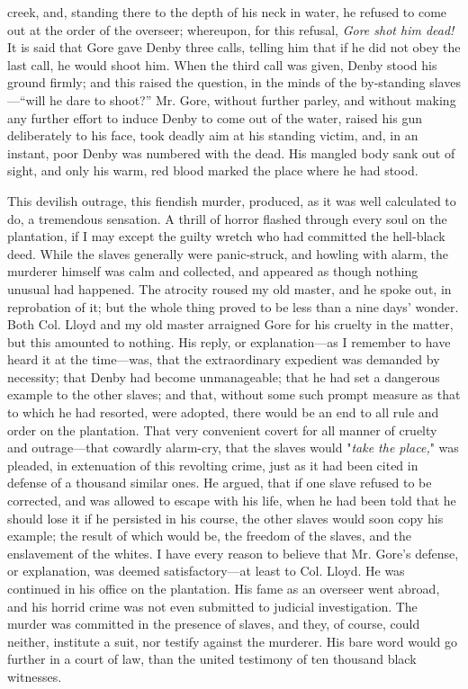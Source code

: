 creek, and, standing there to the depth of his neck in water, he refused
to come out at the order of the overseer; whereupon, for this refusal,
\emph{Gore shot him dead!} It is said that Gore gave Denby three calls,
telling him that if he did not obey the last call, he would shoot him.
When the third call was given, Denby stood his ground firmly; and this
raised the question, in the minds of the by-standing slaves---``will he
dare to shoot?'' Mr. Gore, without further parley, and without making
any further effort to induce Denby to come out of the water, raised his
gun deliberately to his face, took deadly aim at his standing victim,
and, in an instant, poor Denby was numbered with the dead. His mangled
body sank out of {}sight, and only his warm, red blood marked the place
where he had stood.

This devilish outrage, this fiendish murder, produced, as it was well
calculated to do, a tremendous sensation. A thrill of horror flashed
through every soul on the plantation, if I may except the guilty wretch
who had committed the hell-black deed. While the slaves generally were
panic-struck, and howling with alarm, the murderer himself was calm and
collected, and appeared as though nothing unusual had happened. The
atrocity roused my old master, and he spoke out, in reprobation of it;
but the whole thing proved to be less than a nine days' wonder. Both
Col. Lloyd and my old master arraigned Gore for his cruelty in the
matter, but this amounted to nothing. His reply, or explanation---as I
remember to have heard it at the time---was, that the extraordinary
expedient was demanded by necessity; that Denby had become unmanageable;
that he had set a dangerous example to the other slaves; and that,
without some such prompt measure as that to which he had resorted, were
adopted, there would be an end to all rule and order on the plantation.
That very convenient covert for all manner of cruelty and outrage---that
cowardly alarm-cry, that the slaves would "\emph{take the place,}" was
pleaded, in extenuation of this revolting crime, just as it had been
cited in defense of a thousand similar ones. He argued, that if one
slave refused to be corrected, and was allowed to escape with his life,
when he had been told that he should lose it if he persisted in his
course, the other slaves would soon copy his example; the result of
which would be, the {}freedom of the slaves, and the enslavement of the
whites. I have every reason to believe that Mr. Gore's defense, or
explanation, was deemed satisfactory---at least to Col. Lloyd. He was
continued in his office on the plantation. His fame as an overseer went
abroad, and his horrid crime was not even submitted to judicial
investigation. The murder was committed in the presence of slaves, and
they, of course, could neither, institute a suit, nor testify against
the murderer. His bare word would go further in a court of law, than the
united testimony of ten thousand black witnesses.

